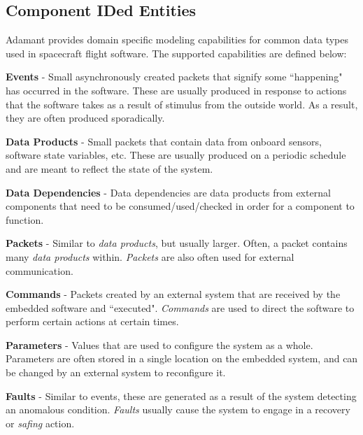 \subsection{Component IDed Entities} \label{Component IDed Entities}

Adamant provides domain specific modeling capabilities for common data types used in spacecraft flight software. The supported capabilities are defined below:

\vspace{5mm} %
\begin{spaceditemize}
  \item \textbf{Events} - Small asynchronously created packets that signify some ``happening" has occurred in the software. These are usually produced in response to actions that the software takes as a result of stimulus from the outside world. As a result, they are often produced sporadically.
  \item \textbf{Data Products} - Small packets that contain data from onboard sensors, software state variables, etc. These are usually produced on a periodic schedule and are meant to reflect the state of the system.
  \item \textbf{Data Dependencies} - Data dependencies are data products from external components that need to be consumed/used/checked in order for a component to function.
  \item \textbf{Packets} - Similar to \textit{data products}, but usually larger. Often, a packet contains many \textit{data products} within. \textit{Packets} are also often used for external communication.
  \item \textbf{Commands} - Packets created by an external system that are received by the embedded software and ``executed". \textit{Commands} are used to direct the software to perform certain actions at certain times.
  \item \textbf{Parameters} - Values that are used to configure the system as a whole. Parameters are often stored in a single location on the embedded system, and can be changed by an external system to reconfigure it.
  \item \textbf{Faults} - Similar to events, these are generated as a result of the system detecting an anomalous condition. \textit{Faults} usually cause the system to engage in a recovery or \textit{safing} action.
\end{spaceditemize}
\vspace{5mm} %

